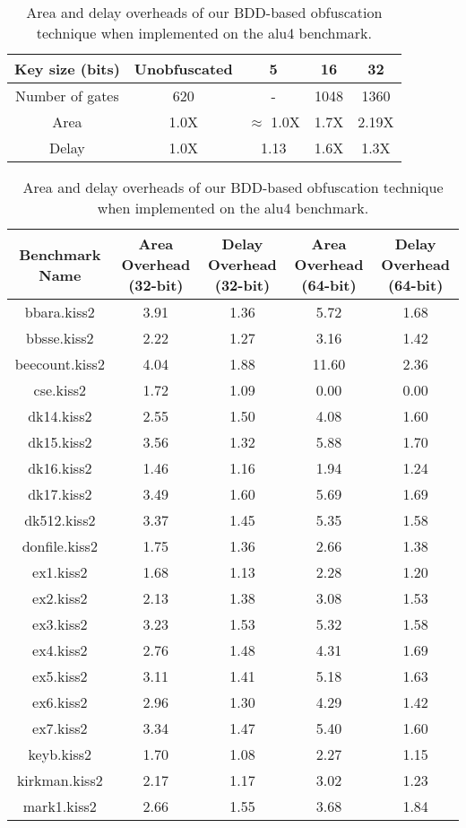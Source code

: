 \begin{table*}
\caption{Area and delay overheads of our BDD-based obfuscation technique when implemented on the alu4 benchmark. }
\begin{tabular}{ | c | c | c | c | c | }
\hline
 Key size (bits) & Unobfuscated & 5 & 16 & 32 \\
\hline
Number of gates & 620 & - & 1048 & 1360 \\
Area & 1.0X & $\approx$ 1.0X & 1.7X & 2.19X \\
Delay & 1.0X & 1.13 & 1.6X & 1.3X \\
\hline
\end{tabular}
\end{table*}

\begin{table*}
\caption{Area and delay overheads of our BDD-based obfuscation technique when implemented on the alu4 benchmark. }
\begin{tabular}{ | c | c | c | c | c | }
\hline
 Benchmark Name & Area Overhead (32-bit) & Delay Overhead (32-bit)  & Area Overhead (64-bit) & Delay Overhead (64-bit) \\
\hline
bbara.kiss2&3.91&1.36&5.72&1.68\\
bbsse.kiss2&2.22&1.27&3.16&1.42\\
beecount.kiss2&4.04&1.88&11.60&2.36\\
cse.kiss2&1.72&1.09&0.00&0.00\\
dk14.kiss2&2.55&1.50&4.08&1.60\\
dk15.kiss2&3.56&1.32&5.88&1.70\\
dk16.kiss2&1.46&1.16&1.94&1.24\\
dk17.kiss2&3.49&1.60&5.69&1.69\\
dk512.kiss2&3.37&1.45&5.35&1.58\\
donfile.kiss2&1.75&1.36&2.66&1.38\\
ex1.kiss2&1.68&1.13&2.28&1.20\\
ex2.kiss2&2.13&1.38&3.08&1.53\\
ex3.kiss2&3.23&1.53&5.32&1.58\\
ex4.kiss2&2.76&1.48&4.31&1.69\\
ex5.kiss2&3.11&1.41&5.18&1.63\\
ex6.kiss2&2.96&1.30&4.29&1.42\\
ex7.kiss2&3.34&1.47&5.40&1.60\\
keyb.kiss2&1.70&1.08&2.27&1.15\\
kirkman.kiss2&2.17&1.17&3.02&1.23\\
mark1.kiss2&2.66&1.55&3.68&1.84\\

\end{tabular}
\end{table*}
